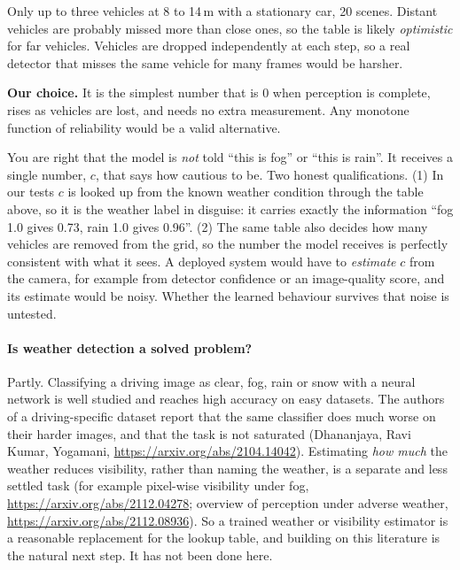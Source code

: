 \begin{description}[leftmargin=2.6cm,style=nextline]
\item[Limits of the measurement] Only up to three vehicles at 8 to 14\,m with a stationary car, 20 scenes. Distant vehicles are probably missed more than close ones, so the table is likely \emph{optimistic} for far vehicles. Vehicles are dropped independently at each step, so a real detector that misses the same vehicle for many frames would be harsher.
\item[Why $c=1-p_{\text{keep}}$] \textbf{Our choice.} It is the simplest number that is 0 when perception is complete, rises as vehicles are lost, and needs no extra measurement. Any monotone function of reliability would be a valid alternative.
\end{description}
\begin{implicationbox}
You are right that the model is \emph{not} told ``this is fog'' or ``this is rain''. It receives a single number, $c$, that says how cautious to be. Two honest qualifications. (1) In our tests $c$ is looked up from the known weather condition through the table above, so it is the weather label in disguise: it carries exactly the information ``fog 1.0 gives 0.73, rain 1.0 gives 0.96''. (2) The same table also decides how many vehicles are removed from the grid, so the number the model receives is perfectly consistent with what it sees. A deployed system would have to \emph{estimate} $c$ from the camera, for example from detector confidence or an image-quality score, and its estimate would be noisy. Whether the learned behaviour survives that noise is untested.
\end{implicationbox}
\paragraph{Is weather detection a solved problem?} Partly. Classifying a driving image as clear, fog, rain or snow with a neural network is well studied and reaches high accuracy on easy datasets. The authors of a driving-specific dataset report that the same classifier does much worse on their harder images, and that the task is not saturated (Dhananjaya, Ravi Kumar, Yogamani, \url{https://arxiv.org/abs/2104.14042}). Estimating \emph{how much} the weather reduces visibility, rather than naming the weather, is a separate and less settled task (for example pixel-wise visibility under fog, \url{https://arxiv.org/abs/2112.04278}; overview of perception under adverse weather, \url{https://arxiv.org/abs/2112.08936}). So a trained weather or visibility estimator is a reasonable replacement for the lookup table, and building on this literature is the natural next step. It has not been done here.

